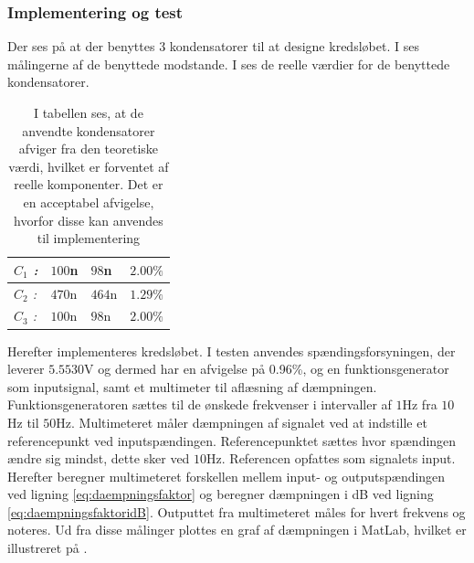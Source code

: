 \subsubsection{Implementering og test} 
Der ses på  at der benyttes 3 kondensatorer til at designe kredsløbet. I  ses målingerne af de benyttede modstande. I  ses de reelle værdier for de benyttede kondensatorer.
\begin{table}[H]
	\centering
	\begin{tabular}{|l|l|l|l|}
		\hline
		\textit{$C_{1}$ :}                            & $100$n             & $98$n              & $2.00\%$           \\ \hline
		\textit{$C_{2}$ :}                            & $470$n             & $464$n             & $1.29\%$           \\ \hline 
		\textit{$C_{3}$ :}                            & $100$n             & $98$n              & $2.00\%$           \\ \hline
	\end{tabular}
	\caption{I tabellen ses, at de anvendte kondensatorer afviger fra den teoretiske værdi, hvilket er forventet af reelle komponenter. Det er en acceptabel afvigelse, hvorfor disse kan anvendes til implementering}
	\label{Tab:Maalingfilter}
\end{table}
\noindent Herefter implementeres kredsløbet. I testen anvendes spændingsforsyningen, der leverer $5.5530$V og dermed har en afvigelse på 0.96\%, og en funktionsgenerator som inputsignal, samt et multimeter til aflæsning af dæmpningen. Funktionsgeneratoren sættes til de ønskede frekvenser i intervaller af $1$Hz fra $10$Hz til $50$Hz. Multimeteret måler dæmpningen af signalet ved at indstille et referencepunkt ved inputspændingen. Referencepunktet sættes hvor spændingen ændre sig mindst, dette sker ved $10$Hz. Referencen opfattes som signalets input. Herefter beregner multimeteret forskellen mellem input- og outputspændingen ved ligning \ref{eq:daempningsfaktor} og beregner dæmpningen i dB ved ligning \ref{eq:daempningsfaktoridB}. Outputtet fra multimeteret måles for hvert frekvens og noteres. Ud fra disse målinger plottes en graf af dæmpningen i MatLab, hvilket er illustreret på .  


